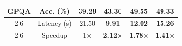 \begin{table}[t!]
{\begin{tabular}{ccc|ccc}
\multirow{4}{*}{\textbf{GPQA}}      
                                & Acc. (\%)      & 39.29             & 43.30         & 49.55                &       49.33            \\ 
\cmidrule{2-6} 
                                & Latency (s)    &     21.50          & \textbf{9.91}         & \textbf{12.02}        &       \textbf{15.26}    \\ 
\cmidrule{2-6} 
                                & Speedup        & 1$\times$         &  \cellcolor{ora}\textbf{2.12}$\times$   &  \cellcolor{ora}\textbf{1.78}$\times$   &     
                                \cellcolor{ora}\textbf{1.41}$\times$
                                
                                \\ \bottomrule
\end{tabular}}
\label{tbl:res_vs_vanilla}
\end{table}



